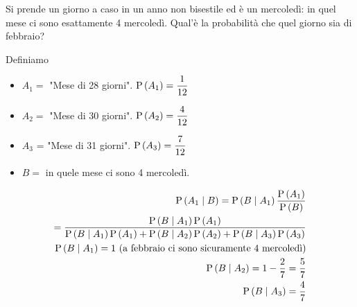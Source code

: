 \begin{exrc}
    Si prende un giorno a caso in un anno non bisestile ed \`e un mercoledì: in quel mese ci sono esattamente 4 mercoledì. Qual'\`e la probabilit\`a che quel giorno sia di febbraio?

    Definiamo
    \begin{itemize}
        \item $ A_1 = $ "Mese di 28 giorni". $ \text{P}\left(A_1\right) = \dfrac{1}{12} $
        \item $ A_2 = $ "Mese di 30 giorni". $ \text{P}\left(A_2\right) = \dfrac{4}{12} $
        \item $ A_3 $ = "Mese di 31 giorni". $ \text{P}\left(A_3\right) = \dfrac{7}{12} $
        \item $ B = $ in quele mese ci sono 4 mercoledì.
    \end{itemize}

    \begin{equation*}
        \begin{aligned}
            \text{P}\left(A_1 \mid B\right) = \text{P}\left(B \mid A_1\right) \dfrac{\text{P}\left(A_1\right)}{\text{P}\left(B\right)} \\
            = \dfrac{\text{P}\left(B \mid A_1\right) \text{P}\left(A_1\right)}{\text{P}\left(B \mid A_1\right)\text{P}\left(A_1\right) + \text{P}\left(B \mid A_2\right)\text{P}\left(A_2\right) + \text{P}\left(B \mid A_3\right)\text{P}\left(A_3\right)} \\
            \text{P}\left(B \mid A_1\right) = 1 \text{ (a febbraio ci sono sicuramente 4 mercoledì)} \\
            \text{P}\left(B \mid A_2\right) = 1 - \dfrac{2}{7} = \dfrac{5}{7}\\
            \text{P}\left(B \mid A_3\right) = \dfrac{4}{7}
        \end{aligned}
    \end{equation*}
\end{exrc}


